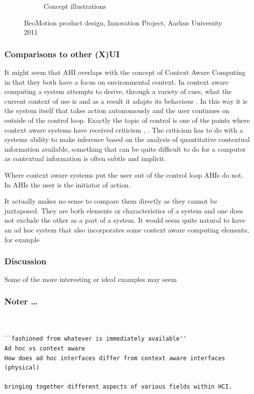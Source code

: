 \begin{figure}
\begin{subfigure}{.54\textwidth}
		\caption{Concept illustrations}
	\end{subfigure}
	\caption{BeoMotion product design, Innovation Project, Aarhus University 2011}
	\label{fig:ch:adhoc:beomotion}
\end{figure}



\subsubsection{Comparisons to other (X)UI} 
It might seem that AHI overlaps with the concept of Context Aware Computing in that they both have a focus on environmental context.
In context aware computing a system attempts to derive, through a variety of cues, what the current context of use is and as a result it adapts its behaviour \citep[chap. 8]{krumm2009ubiquitous}. 
In this way it is the system itself that takes action autonomously and the user continues on outside of the control loop. 
Exactly the topic of control is one of the points where context aware systems have received criticism \cite{erickson2002some}, \citep[chap. 8]{krumm2009ubiquitous}.
The criticism has to do with a systems ability to make inference based on the analysis of quantitative contextual information available, something that can be quite difficult to do for a computer as contextual information is often subtle and implicit.

Where context aware systems put the user out of the control loop AHIs do not.
In AHIs the user is the initiator of action.

It actually makes no sense to compare them directly as they cannot be juxtaposed.
They are both elements or characteristics of a system and one does not exclude the other as a part of a system.
It would seem quite natural to have an ad hoc system that also incorporates some context aware computing elements, for example  
\blank
{}
\blank
{}  
\blank

\subsubsection{Discussion}

Some of the more interesting or ideal examples may seem 

\subsubsection{Noter \dots  } 
\begin{verbatim}


``fashioned from whatever is immediately available''
Ad hoc vs context aware
How does ad hoc interfaces differ from context aware interfaces (physical)

bringing together different aspects of various fields within HCI.

\end{verbatim} 
